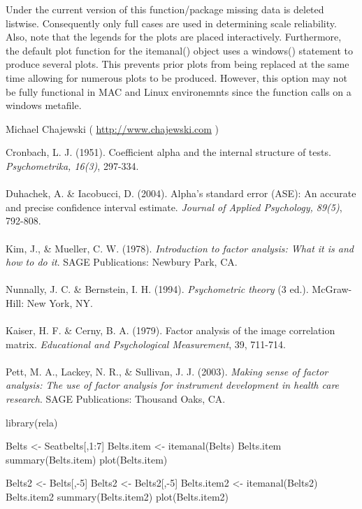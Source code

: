 \begin{Note}\relax
Under the current version of this function/package missing data is deleted listwise. Consequently only full cases are used in determining scale reliability. Also, note that the legends for the plots are placed interactively. 
Furthermore, the default plot function for the itemanal() object uses a windows() statement to produce several 
plots. This prevents prior plots from being replaced at the same time allowing for numerous plots to be produced.
However, this option may not be fully functional in MAC and Linux environemnts since the function calls on a
windows metafile.
\end{Note}
\begin{Author}\relax
Michael Chajewski ( \url{http://www.chajewski.com} )
\end{Author}
\begin{References}\relax
Cronbach, L. J. (1951). Coefficient alpha and the internal structure of tests. \emph{Psychometrika, 16(3)}, 297-334. \\
\\
Duhachek, A. \& Iacobucci, D. (2004). Alpha's standard error (ASE): An accurate and precise confidence interval estimate. \emph{Journal of Applied Psychology, 89(5)}, 792-808. \\
\\
Kim, J., \& Mueller, C. W. (1978). \emph{Introduction to factor analysis: What it is and how to do it}. SAGE Publications: Newbury Park, CA. \\
\\
Nunnally, J. C. \& Bernstein, I. H. (1994). \emph{Psychometric theory} (3 ed.). McGraw-Hill: New York, NY. \\
\\
Kaiser, H. F. \& Cerny, B. A. (1979). Factor analysis of the image correlation matrix. \emph{Educational and Psychological Measurement}, 39, 711-714.\\
\\
Pett, M. A., Lackey, N. R., \& Sullivan, J. J. (2003). \emph{Making sense of factor analysis: The use of factor analysis for instrument development in health care research}. SAGE Publications: Thousand Oaks, CA.
\end{References}
\begin{Examples}
\begin{ExampleCode}

library(rela)

Belts <- Seatbelts[,1:7]
Belts.item <- itemanal(Belts)
Belts.item
summary(Belts.item)
plot(Belts.item)

Belts2 <- Belts[,-5]
Belts2 <- Belts2[,-5] 
Belts.item2 <- itemanal(Belts2)
Belts.item2
summary(Belts.item2)
plot(Belts.item2)
\end{ExampleCode}
\end{Examples}

